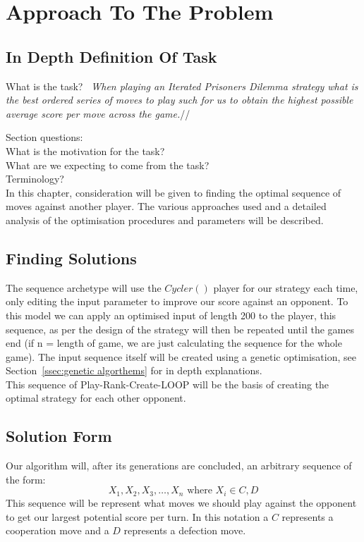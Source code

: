 
\chapter{Approach To The Problem}\label{ch:approach}
\section{In Depth Definition Of Task}\label{sec:inDepthDefinitionOfTask}
What is the task?
{\itshape~When playing an Iterated Prisoners Dilemma strategy what is the best ordered series of moves to play such for us to obtain the highest possible average score per move across the game.}//

Section questions:\\
What is the motivation for the task?\\
What are we expecting to come from the task?\\
Terminology?\\

In this chapter, consideration will be given to finding the optimal sequence of moves against another player. The various approaches used and a detailed analysis of the optimisation procedures and parameters will be described.

\section{Finding Solutions}\label{sec:findingSolutions}
The sequence archetype will use the \(Cycler()\) player for our strategy each time, only editing the input parameter to improve our score against an opponent.
To this model we can apply an optimised input of length 200 to the player, this sequence, as per the design of the strategy will then be repeated until the games end (if n = length of game, we are just calculating the sequence for the whole game).
The input sequence itself will be created using a genetic optimisation, see Section~\ref{ssec:genetic algorthems} for in depth explanations.\\

This sequence of Play-Rank-Create-LOOP will be the basis of creating the optimal strategy for each other opponent.

\section{Solution Form}\label{sec:solutionForm}
Our algorithm will, after its generations are concluded, an arbitrary sequence of the form:
\[X_1,X_2,X_3,\ldots ,X_n \textrm{ where }  X_i \in {C,D}\] 
This sequence will be represent what moves we should play against the opponent to get our largest potential score per turn.
In this notation a \(C\) represents a cooperation move and a \(D\) represents a defection move.\\

